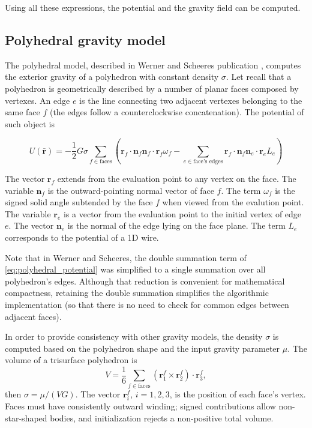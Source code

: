 Using all these expressions, the potential and the gravity field can be computed.

\subsection{Polyhedral gravity model}

The polyhedral model, described in Werner and Scheeres publication\cite{werner1996} , computes the exterior gravity of a polyhedron with constant density $\sigma$. Let recall that a polyhedron is geometrically described by a number of planar faces composed by vertexes. An edge $e$ is the line connecting two adjacent vertexes belonging to the same face $f$ (the edges follow a counterclockwise concatenation). The potential of such object is

\begin{equation}
U(\bar{\mathbf{r}})=- \frac{1}{2}G\sigma\sum_{f\in\text{faces}}\left(\mathbf{r}_f \cdot\mathbf{n}_f\mathbf{n}_f\cdot\mathbf{r}_f\omega_f-\sum_{e\in\text{face's edges}}\mathbf{r}_f\cdot\mathbf{n}_f\mathbf{n}_e\cdot\mathbf{r}_e L_e\right)\label{eq:polyhedral_potential}
\end{equation}

 The vector $\mathbf{r}_f$ extends from the evaluation point to any vertex on the face. The variable $\mathbf{n}_f$ is the outward-pointing normal vector of face $f$. The term $\omega_f$ is the signed solid angle subtended by the face $f$ when viewed from the evalution point. The variable $\mathbf{r}_e$ is a vector from the evaluation point to the initial vertex of edge $e$. The vector $\mathbf{n}_e$ is the normal of the edge lying on the face plane. The term $L_e$ corresponds to the potential of a 1D wire.

 Note that in Werner and Scheeres\cite{werner1996}, the double summation term of \eqref{eq:polyhedral_potential} was simplified to a single summation over all polyhedron's edges. Although that reduction is convenient for mathematical compactness, retaining the double summation simplifies the algorithmic implementation (so that there is no need to check for common edges between adjacent faces).

 In order to provide consistency with other gravity models, the density $\sigma$ is computed based on the polyhedron shape and the input gravity parameter $\mu$. The volume of a trisurface polyhedron is
 \begin{equation}
 V = \frac{1}{6}\sum_{f\in\text{faces}}(\mathbf{r}^{f}_1\times\mathbf{r}^{f}_2)\cdot \mathbf{r}^{f}_3,
 \end{equation}
then $\sigma=\mu / (VG)$. The vector $\mathbf{r}^{f}_i$, $i=1,2,3$, is the position of each face's vertex.
Faces must have consistently outward winding; signed contributions allow
non-star-shaped bodies, and initialization rejects a non-positive total volume.

